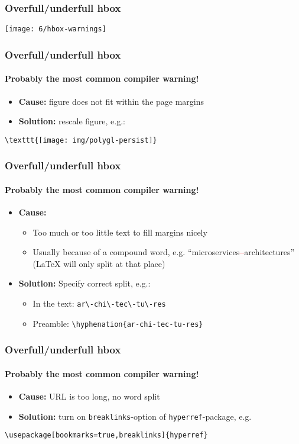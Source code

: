 \documentclass[aspectratio=169]{beamer}
\begin{document}
\begin{frame}
  \frametitle{Overfull/underfull hbox}

  \texttt{[image: 6/hbox-warnings]}

\end{frame}

\begin{frame}[fragile]
  \frametitle{Overfull/underfull hbox}
  \framesubtitle{Probably the most common compiler warning!}

  \begin{itemize}
    \item \textbf{Cause:} figure does not fit within the page margins
    \item \textbf{Solution:} rescale figure, e.g.:
  \end{itemize}

\begin{verbatim}
\texttt{[image: img/polygl-persist]}
\end{verbatim}

\end{frame}

\begin{frame}[fragile]
  \frametitle{Overfull/underfull hbox}
   \framesubtitle{Probably the most common compiler warning!}

  \begin{itemize}
   \item \textbf{Cause:}
   \begin{itemize}
       \item Too much or too little text to fill margins nicely
       \item Usually because of a compound word, e.g. ``microservices\textcolor{red}{\textbf{--}}architectures''
       ({\LaTeX} will only split at that place)
   \end{itemize}
   \item \textbf{Solution:} Specify correct split, e.g.:
   \begin{itemize}
       \item In the text: \verb|ar\-chi\-tec\-tu\-res|
       \item Preamble: \verb|\hyphenation{ar-chi-tec-tu-res}|
    \end{itemize}
  \end{itemize}

\end{frame}

\begin{frame}[fragile]
  \frametitle{Overfull/underfull hbox}
  \framesubtitle{Probably the most common compiler warning!}

  \begin{itemize}
    \item \textbf{Cause:} URL is too long, no word split
    \item \textbf{Solution:} turn on \texttt{breaklinks}-option of \texttt{hyperref}-package, e.g.
  \end{itemize}

\begin{verbatim}
\usepackage[bookmarks=true,breaklinks]{hyperref}
\end{verbatim}
\end{frame}
\end{document}
